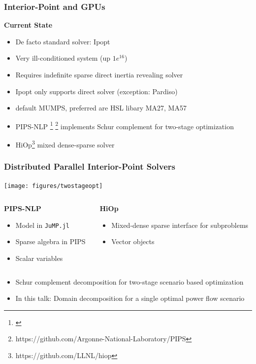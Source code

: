 \begin{frame}[fragile]
  \frametitle{Interior-Point and GPUs}
  {\bf Current State}
  \begin{itemize}
    \item De facto standard solver: Ipopt
    \item Very ill-conditioned system (up $1e^{16}$)
    \item Requires indefinite sparse direct inertia revealing solver
    \item Ipopt only supports direct solver (exception: Pardiso)
    \item default MUMPS, preferred are HSL libary MA27, MA57 
    \item PIPS-NLP \footnote{\cite{pips}} \footnote{https://github.com/Argonne-National-Laboratory/PIPS} implements Schur complement for two-stage optimization
    \item HiOp\footnote{https://github.com/LLNL/hiop} mixed dense-sparse solver 
  \end{itemize}
\end{frame}
\begin{frame}
  \frametitle{Distributed Parallel Interior-Point Solvers}
  \begin{center}
    \texttt{[image: figures/twostageopt]}
  \end{center}
  \begin{columns}[T]
    \begin{column}{0.45\textwidth}
      {\bf PIPS-NLP}
      \begin{itemize}
        \item Model in \lstinline{JuMP.jl}
        \item Sparse algebra in PIPS
        \item Scalar variables
      \end{itemize}
    \end{column}
    \begin{column}{0.45\textwidth}
      {\bf HiOp}
      \begin{itemize}
        \item Mixed-dense sparse interface for subproblems
        \item Vector objects
      \end{itemize}
    \end{column}
  \end{columns}
  \begin{itemize}
    \item Schur complement decomposition for two-stage scenario based optimization
    \item In this talk: \alert{Domain decomposition for a single optimal power flow scenario}
  \end{itemize}
\end{frame}


